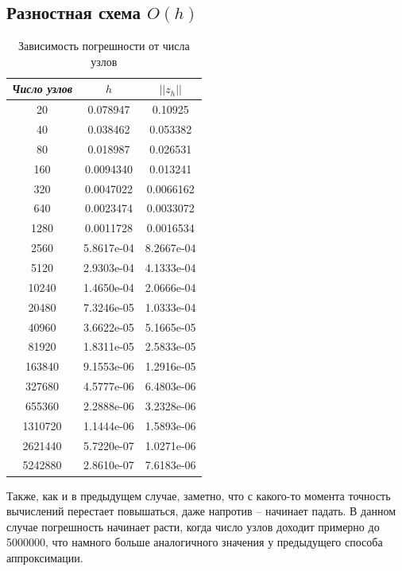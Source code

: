 \documentclass[12pt]{article}
\begin{document}
\subsection{Разностная схема $O(h)$}

\begin{table}[H]
\caption{Зависимость погрешности от числа узлов}
\begin{center}
\begin{tabular}{|c|c|c|}
\hline
\textit{Число узлов} &$ h$ & $||z_h||$  \\
\hline
20 & 0.078947 & 0.10925 \\
\hline
40 & 0.038462 & 0.053382 \\
\hline
80 & 0.018987 & 0.026531 \\
\hline
160 & 0.0094340 & 0.013241\\
\hline
320 & 0.0047022 & 0.0066162 \\
\hline
640 & 0.0023474 & 0.0033072 \\
\hline
1280 & 0.0011728 &  0.0016534\\
\hline
2560 & 5.8617e-04 & 8.2667e-04 \\
\hline
5120 & 2.9303e-04 & 4.1333e-04 \\
\hline
10240 & 1.4650e-04 & 2.0666e-04 \\
\hline
20480 & 7.3246e-05 & 1.0333e-04 \\
\hline
40960 & 3.6622e-05 & 5.1665e-05 \\
\hline
81920 & 1.8311e-05 & 2.5833e-05 \\
\hline
163840 & 9.1553e-06 & 1.2916e-05 \\
\hline
327680 & 4.5777e-06 & 6.4803e-06 \\
\hline
655360 & 2.2888e-06 & 3.2328e-06 \\
\hline
1310720 & 1.1444e-06 & 1.5893e-06 \\
\hline
2621440 & 5.7220e-07 & 1.0271e-06 \\
\hline
5242880 & 2.8610e-07 & 7.6183e-06 \\
\hline
\end{tabular}
\end{center}
\end{table}

Также, как и в предыдущем случае, заметно, что с какого-то момента точность вычислений перестает повышаться, даже напротив – начинает падать. В данном случае погрешность начинает расти, когда число узлов доходит примерно до 5000000, что намного больше аналогичного значения у предыдущего способа аппроксимации.
\end{document}
